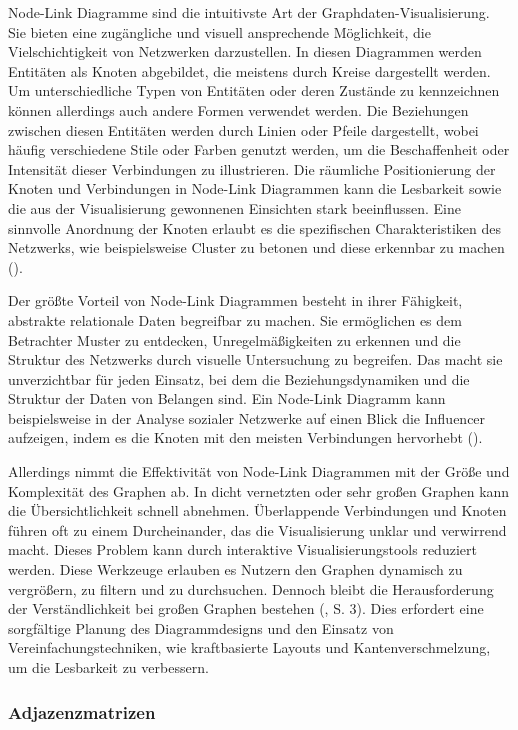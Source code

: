 Node-Link Diagramme sind die intuitivste Art der Graphdaten-Visualisierung. Sie bieten eine zugängliche und visuell  ansprechende Möglichkeit, die Vielschichtigkeit von Netzwerken darzustellen. In diesen Diagrammen werden Entitäten als Knoten abgebildet, die meistens durch Kreise dargestellt werden. Um unterschiedliche Typen von Entitäten oder deren Zustände zu kennzeichnen können allerdings auch andere Formen verwendet werden. Die Beziehungen zwischen diesen Entitäten werden durch Linien oder Pfeile dargestellt, wobei häufig verschiedene Stile oder Farben genutzt werden, um die Beschaffenheit oder Intensität dieser Verbindungen zu illustrieren. Die räumliche Positionierung der Knoten und Verbindungen in Node-Link Diagrammen kann die Lesbarkeit sowie die aus der Visualisierung gewonnenen Einsichten stark beeinflussen. Eine sinnvolle Anordnung der Knoten erlaubt es die spezifischen Charakteristiken des Netzwerks, wie beispielsweise Cluster zu betonen und diese erkennbar zu machen (\cite{nodelink:Basics}).

Der größte Vorteil von Node-Link Diagrammen besteht in ihrer Fähigkeit, abstrakte relationale Daten begreifbar zu machen. Sie ermöglichen es dem Betrachter Muster zu entdecken, Unregelmäßigkeiten zu erkennen und die Struktur des Netzwerks durch visuelle Untersuchung zu begreifen. Das macht sie unverzichtbar für jeden Einsatz, bei dem die Beziehungsdynamiken und die Struktur der Daten von Belangen sind. Ein Node-Link Diagramm kann beispielsweise in der Analyse sozialer Netzwerke auf einen Blick die Influencer aufzeigen, indem es die Knoten mit den meisten Verbindungen hervorhebt (\cite{nodelink:Basics}).

Allerdings nimmt die Effektivität von Node-Link Diagrammen mit der Größe und Komplexität des Graphen ab. In dicht vernetzten oder sehr großen Graphen kann die Übersichtlichkeit schnell abnehmen. Überlappende Verbindungen und Knoten führen oft zu einem Durcheinander, das die Visualisierung unklar und verwirrend macht. Dieses Problem kann durch interaktive Visualisierungstools reduziert werden. Diese Werkzeuge erlauben es Nutzern den Graphen dynamisch zu vergrößern, zu filtern und zu durchsuchen. Dennoch bleibt die Herausforderung der Verständlichkeit bei großen Graphen bestehen (\cite{nodelink:DynamicGraph}, S. 3). Dies erfordert eine sorgfältige Planung des Diagrammdesigns und den Einsatz von Vereinfachungstechniken, wie kraftbasierte Layouts und Kantenverschmelzung, um die Lesbarkeit zu verbessern.

\subsubsection{Adjazenzmatrizen}

